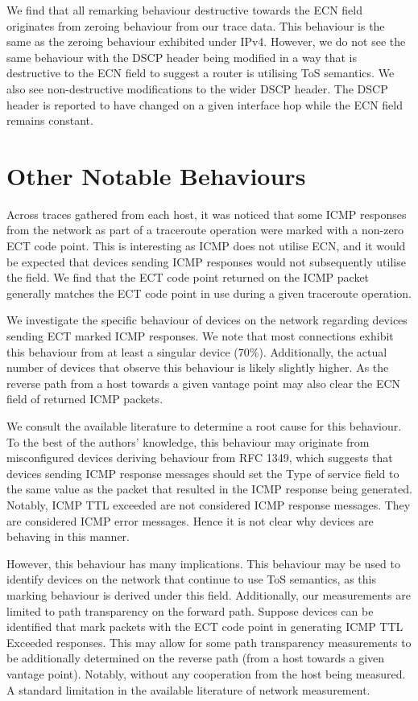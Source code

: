 \documentclass{l4proj}
\begin{document}
We find that all remarking behaviour destructive towards the ECN field originates from zeroing behaviour from our trace data. This behaviour is the same as the zeroing behaviour exhibited under IPv4. However, we do not see the same behaviour with the DSCP header being modified in a way that is destructive to the ECN field to suggest a router is utilising ToS semantics. We also see non-destructive modifications to the wider DSCP header. The DSCP header is reported to have changed on a given interface hop while the ECN field remains constant. 

\section{Other Notable Behaviours}
\label{sec:other}

Across traces gathered from each host, it was noticed that some ICMP responses from the network as part of a traceroute operation were marked with a non-zero ECT code point. This is interesting as ICMP does not utilise ECN, and it would be expected that devices sending ICMP responses would not subsequently utilise the field. We find that the ECT code point returned on the ICMP packet generally matches the ECT code point in use during a given traceroute operation.

We investigate the specific behaviour of devices on the network regarding devices sending ECT marked ICMP responses. We note that most connections exhibit this behaviour from at least a singular device (70\%). Additionally, the actual number of devices that observe this behaviour is likely slightly higher. As the reverse path from a host towards a given vantage point may also clear the ECN field of returned ICMP packets.

We consult the available literature to determine a root cause for this behaviour. To the best of the authors' knowledge, this behaviour may originate from misconfigured devices deriving behaviour from RFC 1349, which suggests that devices sending ICMP response messages should set the Type of service field to the same value as the packet that resulted in the ICMP response being generated\cite{rfc1349}. Notably, ICMP TTL exceeded are not considered ICMP response messages. They are considered ICMP error messages. Hence it is not clear why devices are behaving in this manner.

However, this behaviour has many implications. This behaviour may be used to identify devices on the network that continue to use ToS semantics, as this marking behaviour is derived under this field. Additionally, our measurements are limited to path transparency on the forward path. Suppose devices can be identified that mark packets with the ECT code point in generating ICMP TTL Exceeded responses. This may allow for some path transparency measurements to be additionally determined on the reverse path (from a host towards a given vantage point). Notably, without any cooperation from the host being measured. A standard limitation in the available literature of network measurement.
\end{document}
